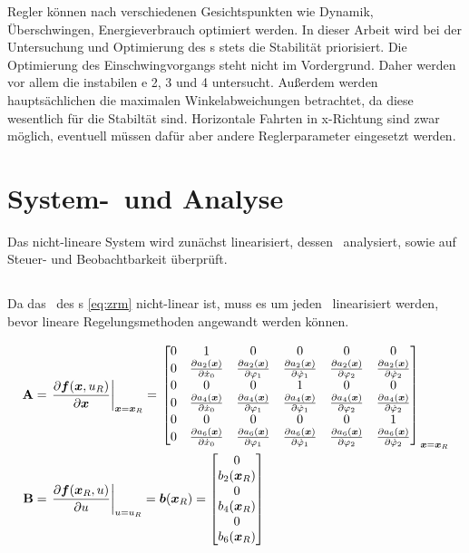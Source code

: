 Regler können nach verschiedenen Gesichtspunkten wie Dynamik, Überschwingen, Energieverbrauch optimiert werden.
In dieser Arbeit wird bei der Untersuchung und Optimierung des \dpd s stets die Stabilität priorisiert.
Die Optimierung des Einschwingvorgangs steht nicht im Vordergrund.
Daher werden vor allem die instabilen \ap e 2, 3 und 4 untersucht.
Außerdem werden hauptsächlichen die maximalen Winkelabweichungen betrachtet, da diese wesentlich für die Stabiltät sind.
Horizontale Fahrten in x-Richtung sind zwar möglich, eventuell müssen dafür aber andere Reglerparameter eingesetzt werden.


\section{System-\lin\ und Analyse}%

Das nicht-lineare System wird zunächst linearisiert, dessen \ewe\ analysiert, sowie auf Steuer- und Beobachtbarkeit überprüft.

\subsection{\lin}\label{subsec:lin}

Da das \zrm\ des \spds s \eqref{eq:zrm} nicht-linear ist, muss es um jeden \ap\ linearisiert werden, bevor lineare Regelungsmethoden angewandt werden können. 

\begin{align}
	{\ensuremath{\boldsymbol{\mathrm{A}}}} &= \left. \frac{\partial \boldsymbol{f}(\boldsymbol{x},u_R)}{\partial \boldsymbol{x}} \right|_{\boldsymbol{x}=\boldsymbol{x}_R}  
		= \left. \begin{bmatrix}
		0 & 1 & 0 & 0 & 0 & 0 \\
		0 & \frac{\partial a_2(\boldsymbol{x})}{\partial \dot{x}_0} & \frac{\partial a_2(\boldsymbol{x})}{\partial \varphi_1} & \frac{\partial a_2(\boldsymbol{x})}{\partial \dot{\varphi}_1} & \frac{\partial a_2(\boldsymbol{x})}{\partial \varphi_2} & \frac{\partial a_2(\boldsymbol{x})}{\partial \dot{\varphi}_2} \\
		0 & 0 & 0 & 1 & 0 & 0 \\
		0 & \frac{\partial a_4(\boldsymbol{x})}{\partial \dot{x}_0} & \frac{\partial a_4(\boldsymbol{x})}{\partial \varphi_1} & \frac{\partial a_4(\boldsymbol{x})}{\partial \dot{\varphi}_1} & \frac{\partial a_4(\boldsymbol{x})}{\partial \varphi_2} & \frac{\partial a_4(\boldsymbol{x})}{\partial \dot{\varphi}_2} \\
		0 & 0 & 0 & 0 & 0 & 1 \\
		0 & \frac{\partial a_6(\boldsymbol{x})}{\partial \dot{x}_0} & \frac{\partial a_6(\boldsymbol{x})}{\partial \varphi_1} & \frac{\partial a_6(\boldsymbol{x})}{\partial \dot{\varphi}_1} & \frac{\partial a_6(\boldsymbol{x})}{\partial \varphi_2} & \frac{\partial a_6(\boldsymbol{x})}{\partial \dot{\varphi}_2} \\
	\end{bmatrix} \right._{\boldsymbol{x}=\boldsymbol{x}_R}  \\
	{\boldsymbol{\mathrm{B}}} &= \left. \frac{\partial \boldsymbol{f}(\boldsymbol{x}_R,u)}{\partial u} \right|_{u=u_R}
	= \boldsymbol{b}(\boldsymbol{x}_R) = \begin{bmatrix}
		0 \\ b_2(\boldsymbol{x}_R) \\ 0 \\  b_4(\boldsymbol{x}_R) \\ 0 \\  b_6(\boldsymbol{x}_R)
	\end{bmatrix}
\end{align}

